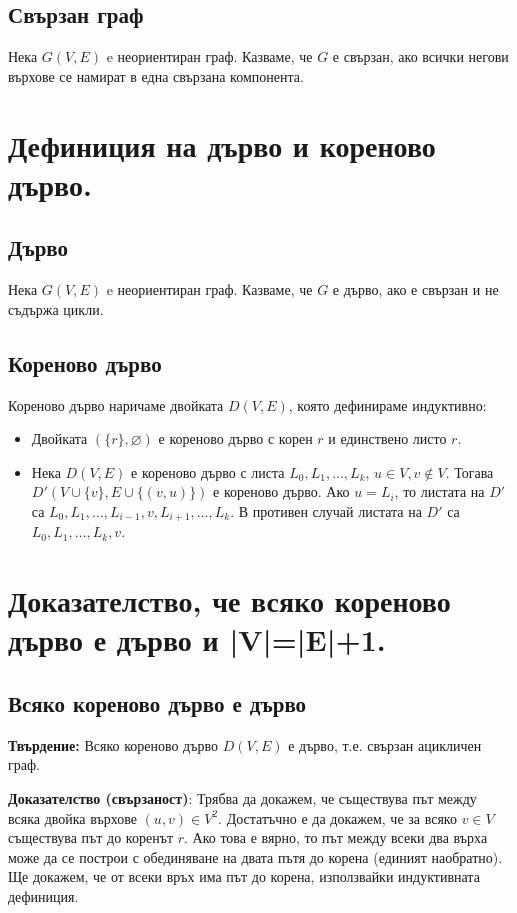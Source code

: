 \documentclass[fleqn,12pt]{article}
\begin{document}
\subsection{Свързан граф}
Нека $G(V, E)$ e неориентиран граф. Казваме, че $G$ е свързан, ако всички негови върхове
се намират в една свързана компонента.

\section{Дефиниция на дърво и кореново дърво.}

\subsection{Дърво}
Нека $G(V, E)$ e неориентиран граф. Казваме, че $G$ е дърво, ако е свързан и не съдържа цикли.

\subsection{Кореново дърво}
Кореново дърво наричаме двойката $D(V, E)$, която дефинираме индуктивно:
\begin{itemize}
	\item Двойката $(\{r\}, \varnothing)$ е кореново дърво с корен $r$ и единствено листо $r$.
	\item Нека $D(V,E)$ е кореново дърво с листа $L_0, L_1, \dots, L_k$, $u \in V, v \notin V$. Тогава $D'(V \cup \{v\}, E \cup \{ (v, u)\})$ е кореново дърво.
	Ако $u = L_i$, то листата на $D'$ са $L_0, L_1, \dots, L_{i-1}, v, L_{i+1}, \dots, L_k$. В противен случай листата на $D'$ са 
	$L_0, L_1, \dots, L_k, v$.
\end{itemize}

\section{Доказателство, че всяко кореново дърво е дърво и |V|=|E|+1.}
\subsection{Всяко кореново дърво е дърво}
\textbf{Твърдение:} Всяко кореново дърво $D(V,E)$ е дърво, т.е. свързан ацикличен граф.

\textbf{Доказателство (свързаност)}: Трябва да докажем, че съществува път между всяка двойка върхове $(u, v) \in V^2$. Достатъчно е да докажем, че 
за всяко $v \in V$ съществува път до коренът $r$. Ако това е вярно, то път между всеки два върха може да се построи с обединяване на двата пътя до корена 
(единият наобратно). Ще докажем, че от всеки връх има път до корена, използвайки индуктивната дефиниция.
\end{document}
